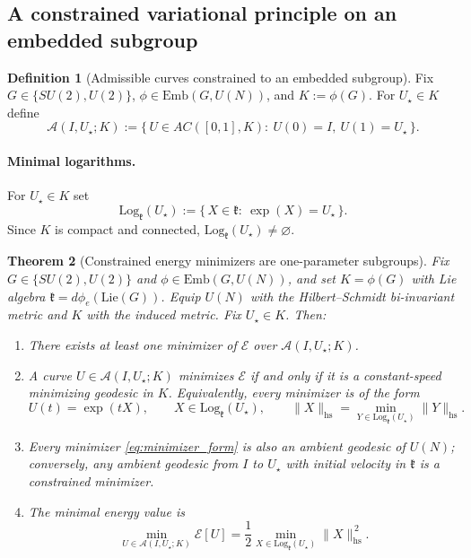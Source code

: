 \documentclass{article}%
\newtheorem{theorem}{Theorem}[section]
\theoremstyle{definition}
\newtheorem{definition}[theorem]{Definition}
\numberwithin{equation}{section}
\newcommand{\Emb}{\mathrm{Emb}}
\newcommand{\Log}{\mathrm{Log}}
\newcommand{\Lie}{\mathrm{Lie}}
\begin{document}
\subsection{A constrained variational principle on an embedded subgroup}
\label{subsec:constrained_variational_principle}

\begin{definition}[Admissible curves constrained to an embedded subgroup]\label{def:admissible_curves}
Fix $G\in\{SU(2),U(2)\}$, $\phi\in\Emb(G,U(N))$, and $K:=\phi(G)$. For $U_{\star}\in K$ define
\[
\mathcal{A}(I,U_{\star};K)
:=\big\{\,U\in AC([0,1],K):\ U(0)=I,\ U(1)=U_{\star}\,\big\}.
\]
\end{definition}

\paragraph{Minimal logarithms.}
For $U_{\star}\in K$ set
\[
\Log_{\mathfrak{k}}(U_{\star}):=\{\,X\in\mathfrak{k}:\ \exp(X)=U_{\star}\,\}.
\]
Since $K$ is compact and connected, $\Log_{\mathfrak{k}}(U_{\star})\neq\varnothing$.

\begin{theorem}[Constrained energy minimizers are one-parameter subgroups]
\label{thm:variational_characterization}
Fix $G\in\{SU(2),U(2)\}$ and $\phi\in\Emb(G,U(N))$, and set $K=\phi(G)$ with Lie algebra $\mathfrak{k}=d\phi_e(\Lie(G))$.
Equip $U(N)$ with the Hilbert--Schmidt bi-invariant metric and $K$ with the induced metric. Fix $U_{\star}\in K$. Then:
\begin{enumerate}
\item[(i)] There exists at least one minimizer of $\mathcal{E}$ over $\mathcal{A}(I,U_{\star};K)$.
\item[(ii)] A curve $U\in\mathcal{A}(I,U_{\star};K)$ minimizes $\mathcal{E}$ if and only if it is a constant-speed minimizing geodesic in $K$.
Equivalently, every minimizer is of the form
\begin{equation}\label{eq:minimizer_form}
U(t)=\exp(tX),\qquad
X\in\Log_{\mathfrak{k}}(U_{\star}),
\qquad
\|X\|_{\mathrm{hs}}=\min_{Y\in\Log_{\mathfrak{k}}(U_{\star})}\|Y\|_{\mathrm{hs}}.
\end{equation}
\item[(iii)] Every minimizer \eqref{eq:minimizer_form} is also an ambient geodesic of $U(N)$; conversely, any ambient geodesic from $I$
to $U_{\star}$ with initial velocity in $\mathfrak{k}$ is a constrained minimizer.
\item[(iv)] The minimal energy value is
\begin{equation}\label{eq:Emin_log}
\min_{U\in\mathcal{A}(I,U_{\star};K)}\mathcal{E}[U]
=\frac12\min_{X\in\Log_{\mathfrak{k}}(U_{\star})}\|X\|_{\mathrm{hs}}^{\,2}.
\end{equation}
\end{enumerate}
\end{theorem}
\end{document}
